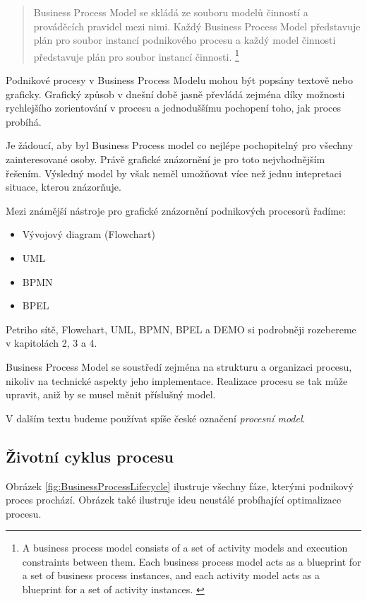 \begin{quote}
Business Process Model se skládá ze souboru modelů činností a prováděcích pravidel mezi nimi. Každý Business Process Model představuje plán pro soubor instancí podnikového procesu a každý model činnosti představuje plán pro soubor instancí činnosti.
\footnote{A business process model consists of a set of activity models and execution constraints between them. Each business process model acts as a blueprint for a set of business process instances, and each activity model acts as a blueprint for a set of activity instances. \cite{Weske2007}}
\end{quote}

Podnikové procesy v Business Process Modelu mohou být popsány textově nebo graficky. Grafický způsob v dnešní době jasně převládá zejména díky možnosti rychlejšího zorientování v procesu a jednoduššímu pochopení toho, jak proces probíhá.

Je žádoucí, aby byl Business Process model co nejlépe pochopitelný pro všechny zainteresované osoby. Právě grafické znázornění je pro toto nejvhodnějším řešením. Výsledný model by však neměl umožňovat více než jednu intepretaci situace, kterou znázorňuje.

Mezi známější nástroje pro grafické znázornění podnikových procesorů řadíme: \cite{Naplava2015}
\begin{itemize}
\item Vývojový diagram (Flowchart)
\item UML
\item BPMN
\item BPEL
\end{itemize}

Petriho sítě, Flowchart, UML, BPMN, BPEL a DEMO si podrobněji rozebereme v kapitolách 2, 3 a 4. %

Business Process Model se soustředí zejména na strukturu a organizaci procesu, nikoliv na technické aspekty jeho implementace. Realizace procesu se tak může upravit, aniž by se musel měnit příslušný model.

V dalším textu budeme používat spíše české označení \textit{procesní model}.

\subsection{Životní cyklus procesu}
Obrázek \ref{fig:BusinessProcessLifecycle} ilustruje všechny fáze, kterými podnikový proces prochází. Obrázek také ilustruje ideu neustálé probíhající optimalizace procesu.

